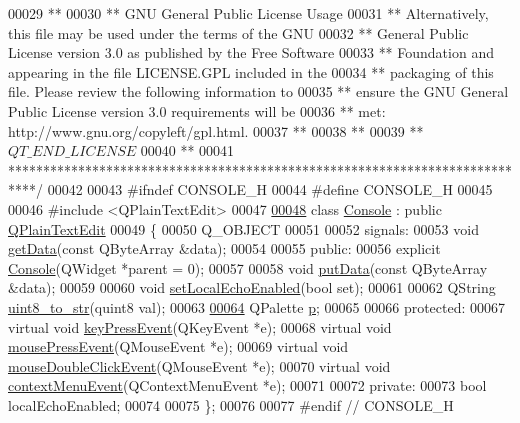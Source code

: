 \begin{DoxyCode}
00029 \textcolor{comment}{**}
00030 \textcolor{comment}{** GNU General Public License Usage}
00031 \textcolor{comment}{** Alternatively, this file may be used under the terms of the GNU}
00032 \textcolor{comment}{** General Public License version 3.0 as published by the Free Software}
00033 \textcolor{comment}{** Foundation and appearing in the file LICENSE.GPL included in the}
00034 \textcolor{comment}{** packaging of this file.  Please review the following information to}
00035 \textcolor{comment}{** ensure the GNU General Public License version 3.0 requirements will be}
00036 \textcolor{comment}{** met: http://www.gnu.org/copyleft/gpl.html.}
00037 \textcolor{comment}{**}
00038 \textcolor{comment}{**}
00039 \textcolor{comment}{** $QT\_END\_LICENSE$}
00040 \textcolor{comment}{**}
00041 \textcolor{comment}{****************************************************************************/}
00042 
00043 \textcolor{preprocessor}{#ifndef CONSOLE\_H}
00044 \textcolor{preprocessor}{#define CONSOLE\_H}
00045 
00046 \textcolor{preprocessor}{#include <QPlainTextEdit>}
00047 
\hypertarget{a00033_source_l00048}{}\hyperlink{a00002}{00048} \textcolor{keyword}{class }\hyperlink{a00002}{Console} : \textcolor{keyword}{public} \hyperlink{a00011}{QPlainTextEdit}
00049 \{
00050     Q\_OBJECT
00051 
00052 signals:
00053     \textcolor{keywordtype}{void} \hyperlink{a00002_a1976aad46ce1a77be730bc628275038f}{getData}(\textcolor{keyword}{const} QByteArray &data);
00054 
00055 \textcolor{keyword}{public}:
00056     \textcolor{keyword}{explicit} \hyperlink{a00002_a1219e6e2000327a02434c56c514bbeda}{Console}(QWidget *parent = 0);
00057 
00058     \textcolor{keywordtype}{void} \hyperlink{a00002_aa744a0868e01a13a502710f895f01525}{putData}(\textcolor{keyword}{const} QByteArray &data);
00059 
00060     \textcolor{keywordtype}{void} \hyperlink{a00002_a5a17c5b6bc6719a26f73a5d0ac3d7de1}{setLocalEchoEnabled}(\textcolor{keywordtype}{bool} set);
00061 
00062     QString \hyperlink{a00002_a9194022b884875614a4f7056454881c1}{uint8\_to\_str}(quint8 val);
00063 
\hypertarget{a00033_source_l00064}{}\hyperlink{a00002_a097b52858dc4b9f1bec8d8d67518daf0}{00064}     QPalette \hyperlink{a00002_a097b52858dc4b9f1bec8d8d67518daf0}{p};
00065 
00066 \textcolor{keyword}{protected}:
00067     \textcolor{keyword}{virtual} \textcolor{keywordtype}{void} \hyperlink{a00002_a558b58e3e68a167a7897a77bee78536c}{keyPressEvent}(QKeyEvent *e);
00068     \textcolor{keyword}{virtual} \textcolor{keywordtype}{void} \hyperlink{a00002_a615736fd63c7fc70536e2b775b0ce745}{mousePressEvent}(QMouseEvent *e);
00069     \textcolor{keyword}{virtual} \textcolor{keywordtype}{void} \hyperlink{a00002_a1727cadc147a07ed86fd4cb91908fd5f}{mouseDoubleClickEvent}(QMouseEvent *e);
00070     \textcolor{keyword}{virtual} \textcolor{keywordtype}{void} \hyperlink{a00002_a199dade448d3ae597d420dc65abca11c}{contextMenuEvent}(QContextMenuEvent *e);
00071 
00072 \textcolor{keyword}{private}:
00073     \textcolor{keywordtype}{bool} localEchoEnabled;
00074 
00075 \};
00076 
00077 \textcolor{preprocessor}{#endif // CONSOLE\_H}
\end{DoxyCode}
